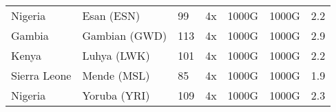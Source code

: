 \begin{longtable}{lllllll}
Nigeria & Esan (ESN) & 99 & 4x & 1000G & 1000G & 2.2 \\
Gambia & Gambian (GWD) & 113 & 4x & 1000G & 1000G & 2.9 \\
Kenya & Luhya (LWK) & 101 & 4x & 1000G & 1000G & 2.2 \\
Sierra Leone & Mende (MSL) & 85 & 4x & 1000G & 1000G & 1.9 \\
Nigeria & Yoruba (YRI) & 109 & 4x & 1000G & 1000G & 2.3 \\

\end{longtable}
